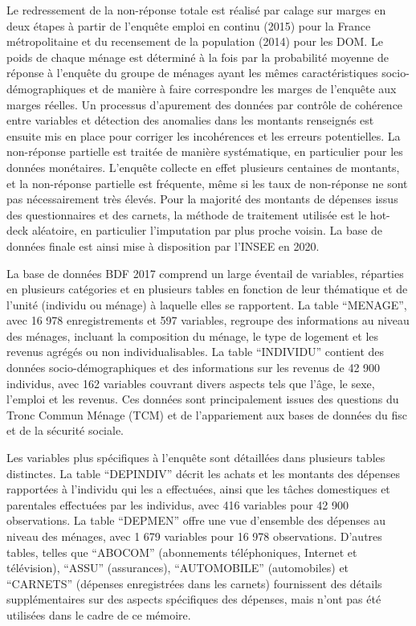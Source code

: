 \documentclass[
  12pt,
]{book}
\begin{document}
Le redressement de la non-réponse totale est réalisé par calage sur
marges en deux étapes à partir de l'enquête emploi en continu (2015)
pour la France métropolitaine et du recensement de la population (2014)
pour les DOM. Le poids de chaque ménage est déterminé à la fois par la
probabilité moyenne de réponse à l'enquête du groupe de ménages ayant
les mêmes caractéristiques socio-démographiques et de manière à faire
correspondre les marges de l'enquête aux marges réelles. Un processus
d'apurement des données par contrôle de cohérence entre variables et
détection des anomalies dans les montants renseignés est ensuite mis en
place pour corriger les incohérences et les erreurs potentielles. La
non-réponse partielle est traitée de manière systématique, en
particulier pour les données monétaires. L'enquête collecte en effet
plusieurs centaines de montants, et la non-réponse partielle est
fréquente, même si les taux de non-réponse ne sont pas nécessairement
très élevés. Pour la majorité des montants de dépenses issus des
questionnaires et des carnets, la méthode de traitement utilisée est le
hot-deck aléatoire, en particulier l'imputation par plus proche voisin.
La base de données finale est ainsi mise à disposition par l'INSEE en
2020.

La base de données BDF 2017 comprend un large éventail de variables,
réparties en plusieurs catégories et en plusieurs tables en fonction de
leur thématique et de l'unité (individu ou ménage) à laquelle elles se
rapportent. La table ``MENAGE'', avec 16 978 enregistrements et 597
variables, regroupe des informations au niveau des ménages, incluant la
composition du ménage, le type de logement et les revenus agrégés ou non
individualisables. La table ``INDIVIDU'' contient des données
socio-démographiques et des informations sur les revenus de 42 900
individus, avec 162 variables couvrant divers aspects tels que l'âge, le
sexe, l'emploi et les revenus. Ces données sont principalement issues
des questions du Tronc Commun Ménage (TCM) et de l'appariement aux bases
de données du fisc et de la sécurité sociale.

Les variables plus spécifiques à l'enquête sont détaillées dans
plusieurs tables distinctes. La table ``DEPINDIV'' décrit les achats et
les montants des dépenses rapportées à l'individu qui les a effectuées,
ainsi que les tâches domestiques et parentales effectuées par les
individus, avec 416 variables pour 42 900 observations. La table
``DEPMEN'' offre une vue d'ensemble des dépenses au niveau des ménages,
avec 1 679 variables pour 16 978 observations. D'autres tables, telles
que ``ABOCOM'' (abonnements téléphoniques, Internet et télévision),
``ASSU'' (assurances), ``AUTOMOBILE'' (automobiles) et ``CARNETS''
(dépenses enregistrées dans les carnets) fournissent des détails
supplémentaires sur des aspects spécifiques des dépenses, mais n'ont pas
été utilisées dans le cadre de ce mémoire.
\end{document}
